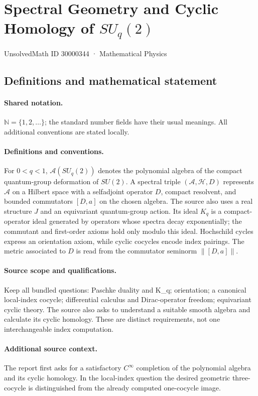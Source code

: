 \documentclass[11pt]{article}
\begin{document}
\setcounter{section}{30000343}
\section{Spectral Geometry and Cyclic Homology of $SU_q(2)$}\label{30000344}
{\small UnsolvedMath ID 30000344 · Mathematical Physics}
\subsection{Definitions and mathematical statement}

\paragraph{Shared notation.}$\mathbb N=\{1,2,\ldots\}$; the standard number fields have their usual meanings. All additional conventions are stated locally.


\paragraph{Definitions and conventions.} For $0<q<1$, $\mathcal A(SU_q(2))$ denotes the polynomial algebra of the compact quantum-group deformation of $SU(2)$. A spectral triple $(\mathcal A,\mathcal H,D)$ represents $\mathcal A$ on a Hilbert space with a selfadjoint operator $D$, compact resolvent, and bounded commutators $[D,a]$ on the chosen algebra. The source also uses a real structure $J$ and an equivariant quantum-group action. Its ideal $K_q$ is a compact-operator ideal generated by operators whose spectra decay exponentially; the commutant and first-order axioms hold only modulo this ideal. Hochschild cycles express an orientation axiom, while cyclic cocycles encode index pairings. The metric associated to $D$ is read from the commutator seminorm $\|[D,a]\|$.

\paragraph{Source scope and qualifications.} Keep all bundled questions: Paschke duality and K\_q; orientation; a canonical local-index cocycle; differential calculus and Dirac-operator freedom; equivariant cyclic theory. The source also asks to understand a suitable smooth algebra and calculate its cyclic homology. These are distinct requirements, not one interchangeable index computation.

\paragraph{Additional source context.} The report first asks for a satisfactory $C^\infty$ completion of the polynomial algebra and its cyclic homology. In the local-index question the desired geometric three-cocycle is distinguished from the already computed one-cocycle image.
\end{document}
